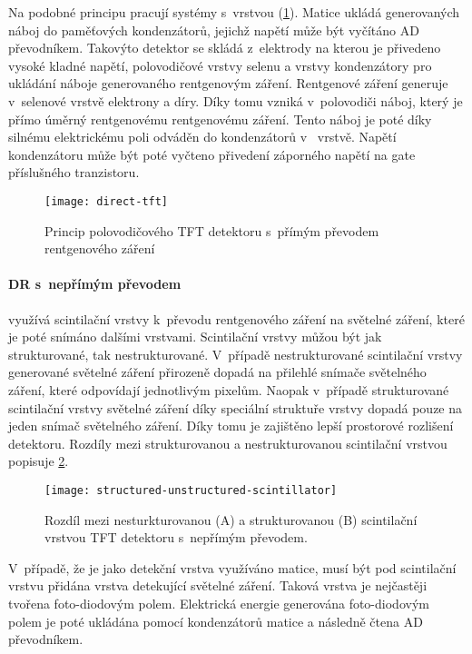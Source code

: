Na podobné principu pracují systémy s~vrstvou  (\cref{fig:direct-tft}). Matice  ukládá generovaných náboj do paměťových kondenzátorů, jejichž napětí může být vyčítáno AD převodníkem. Takovýto detektor se skládá z~elektrody na kterou je přivedeno vysoké kladné napětí, polovodičové vrstvy selenu a vrstvy  kondenzátory pro ukládání náboje generovaného rentgenovým záření. Rentgenové záření generuje v~selenové vrstvě elektrony a díry. Díky tomu vzniká v~polovodiči náboj, který je přímo úměrný rentgenovému rentgenovému záření. Tento náboj je poté díky silnému elektrickému poli odváděn do kondenzátorů v~ vrstvě. Napětí kondenzátoru může být poté vyčteno přivedení záporného napětí na gate příslušného tranzistoru.

\begin{figure}[ht]
\centering
\texttt{[image: direct-tft]}
\caption{Princip polovodičového TFT detektoru s~přímým převodem rentgenového záření \cite[str.~511]{Radiation-Detection-and-Measurement}}
\label{fig:direct-tft}
\end{figure}

\paragraph{DR s~nepřímým převodem}
využívá scintilační vrstvy k~převodu rentgenového záření na světelné záření, které je poté snímáno dalšími vrstvami. Scintilační vrstvy můžou být jak strukturované, tak nestrukturované. V~případě nestrukturované scintilační vrstvy generované světelné záření přirozeně dopadá na přilehlé snímače světelného záření, které odpovídají jednotlivým pixelům. Naopak v~případě strukturované scintilační vrstvy světelné záření díky speciální struktuře vrstvy dopadá pouze na jeden snímač světelného záření. Díky tomu je zajištěno lepší prostorové rozlišení detektoru. Rozdíly mezi strukturovanou a nestrukturovanou scintilační vrstvou popisuje \cref{fig:structured-unstructured-scintillator}.

\begin{figure}[ht]
\centering
\texttt{[image: structured-unstructured-scintillator]}
\caption{Rozdíl mezi nesturkturovanou (A) a strukturovanou (B) scintilační vrstvou TFT detektoru s~nepřímým převodem. \cite[str~210]{Diagnostic-Radiology}}
\label{fig:structured-unstructured-scintillator}
\end{figure}

V~případě, že je jako detekční vrstva využíváno  matice, musí být pod scintilační vrstvu přidána vrstva detekující světelné záření. Taková vrstva je nejčastěji tvořena foto-diodovým polem. Elektrická energie generována foto-diodovým polem je poté ukládána pomocí kondenzátorů  matice a následně  čtena AD převodníkem.

